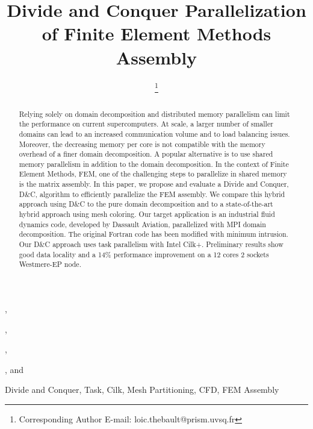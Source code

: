 \documentclass[10pt]{IOS-Book-Article}
\begin{document}
\begin{frontmatter}              %

\title{Divide and Conquer Parallelization of Finite Element Methods Assembly}

\author[A]{ %
\thanks{Corresponding Author E-mail: loic.thebault@prism.uvsq.fr}},
\author[A]{ },
\author[C]{ },
\author[B]{ },
and
\author[A,C]{ }

\address[A]{PRISM - University of Versailles, France}
\address[B]{Dassault Aviation, Saint-Cloud, France}
\address[C]{Exascale Computing Research, France}

\begin{abstract}
Relying solely on domain decomposition and distributed memory parallelism can limit the performance on current supercomputers.
At scale, a larger number of smaller domains can lead to an increased communication volume and to load balancing issues.
Moreover, the decreasing memory per core is not compatible with the memory overhead of a finer domain decomposition.
A popular alternative is to use shared memory parallelism in addition to the domain decomposition.
In the context of Finite Element Methods, FEM, one of the challenging steps to parallelize in shared memory is the matrix assembly.
In this paper, we propose and evaluate a Divide and Conquer, D\&C, algorithm to efficiently parallelize the FEM assembly.
We compare this hybrid approach using D\&C to the pure domain decomposition and to a state-of-the-art hybrid approach using mesh coloring.
Our target application is an industrial fluid dynamics code, developed by Dassault Aviation, parallelized with MPI domain decomposition.
The original Fortran code has been modified with minimum intrusion. Our D\&C approach uses task parallelism with Intel Cilk+.
Preliminary results show good data locality and a 14\% performance improvement on a 12 cores 2 sockets Westmere-EP node.
\end{abstract}

\begin{keyword}
Divide and Conquer, Task, Cilk, Mesh Partitioning, CFD, FEM Assembly
\end{keyword}
\end{frontmatter}

\thispagestyle{empty}
\pagestyle{empty}
\end{document}
